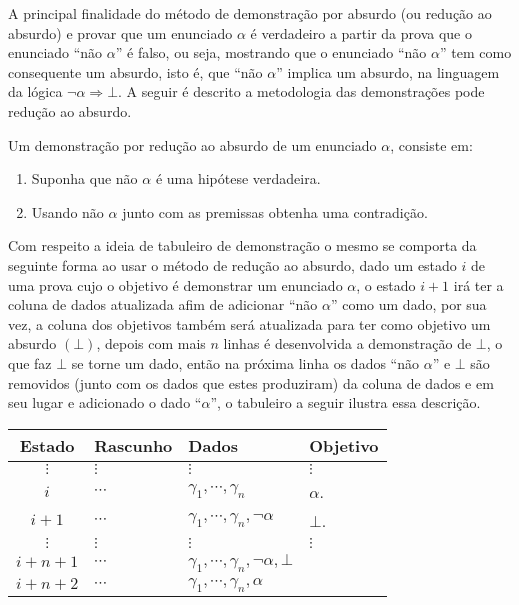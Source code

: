 A principal finalidade do método de demonstração por absurdo (ou redução ao absurdo) e provar que um enunciado $\alpha$ é verdadeiro a partir da prova que o enunciado ``não $\alpha$'' é falso, ou seja, mostrando que o enunciado ``não $\alpha$'' tem como consequente um absurdo, isto é, que ``não $\alpha$'' implica um absurdo, na linguagem da lógica $\neg \alpha \Rightarrow \bot$. A seguir é descrito a metodologia das demonstrações pode redução ao absurdo.

\begin{method}\label{metodo:PorAbsurdo}
	Um demonstração por redução ao absurdo de um enunciado $\alpha$, consiste em:
	\begin{enumerate}
		\item Suponha que não $\alpha$ é uma hipótese verdadeira.
		\item Usando não $\alpha$ junto com as premissas obtenha uma contradição.
	\end{enumerate} 
\end{method}

Com respeito a ideia de tabuleiro de demonstração o mesmo se comporta da seguinte forma ao usar o método de redução ao absurdo, dado um estado $i$ de uma prova cujo o objetivo é demonstrar um enunciado $\alpha$, o estado $i+1$ irá ter a coluna de dados atualizada afim de adicionar ``não $\alpha$'' como um dado, por sua vez, a coluna dos objetivos também será atualizada para ter como objetivo um absurdo $(\bot)$, depois com mais $n$ linhas é desenvolvida a demonstração de $\bot$, o que faz $\bot$ se torne um dado, então na próxima linha os dados ``não $\alpha$'' e $\bot$ são removidos (junto com os dados que estes produziram) da coluna de dados e em seu lugar e adicionado o dado ``$\alpha$'', o tabuleiro a seguir ilustra essa descrição.

\begin{table*}[h]
	\centering
	\begin{tabular}{c|l|l|l}
		\hline
		\rowcolor{cinzaClaro}
		Estado & Rascunho & Dados & Objetivo\\
		\hline
		$\vdots$ & $\vdots$ & $\vdots$ & $\vdots$\\
		$i$ & $\cdots$ &$\gamma_1, \cdots, \gamma_n$ & $\alpha$.\\
		$i+1$ & $\cdots$ & $\gamma_1, \cdots, \gamma_n, \neg \alpha$ & $\bot$.\\
		$\vdots$ & $\vdots$ & $\vdots$ & $\vdots$\\
		$i+n+1$ & $\cdots$ & $\gamma_1, \cdots, \gamma_n, \neg \alpha, \bot$ & \\
		$i+n+2$ & $\cdots$ & $\gamma_1, \cdots, \gamma_n, \alpha$ & \\
		\hline
	\end{tabular}
\end{table*}

